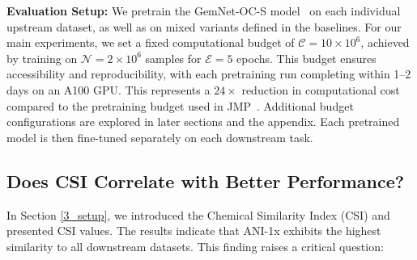 
\noindent\textbf{Evaluation Setup:} We pretrain the GemNet-OC-S model~\cite{gasteiger2022gemnet} on each individual upstream dataset, as well as on mixed variants defined in the baselines. For our main experiments, we set a fixed computational budget of \( \mathcal{C} = 10 \times 10^6 \), achieved by training on \( \mathcal{N} = 2 \times 10^6 \) samples for \( \mathcal{E} = 5 \) epochs. This budget ensures accessibility and reproducibility, with each pretraining run completing within 1–2 days on an A100 GPU. This represents a \( 24\times \) reduction in computational cost compared to the pretraining budget used in JMP~\cite{shoghimolecules}. Additional budget configurations are explored in later sections and the appendix. Each pretrained model is then fine-tuned separately on each downstream task.


\subsection{Does CSI Correlate with Better Performance?}

In Section \ref{3_setup}, we introduced the Chemical Similarity Index (CSI) and presented CSI values. The results indicate that ANI-1x exhibits the highest similarity to all downstream datasets. This finding raises a critical question:

